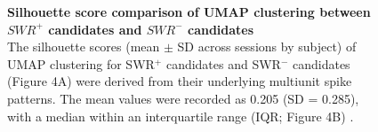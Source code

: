\documentclass{article}
\begin{document}
\begin{figure}
    \centering
    \caption{\textbf{
    Silhouette score comparison of UMAP clustering between $SWR^+$ candidates and $SWR^-$ candidates
    }
    \smallskip
    \\
    The silhouette scores (mean $\pm$ SD across sessions by subject) of UMAP clustering for SWR$^+$ candidates and SWR$^-$ candidates (Figure 4A) were derived from their underlying multiunit spike patterns. The mean values were recorded as 0.205 (SD = 0.285), with a median within an interquartile range (IQR; Figure 4B) \cite{mcinnes_umap_2018, rousseeuw_silhouettes_1987}.
    }
    \label{fig:silhouette_umap}
\end{figure}



\end{document}
